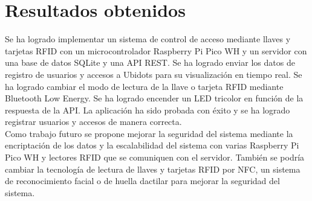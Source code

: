 \documentclass{article}
\begin{document}
\section{Resultados obtenidos}
Se ha logrado implementar un sistema de control de acceso mediante llaves y tarjetas RFID con un microcontrolador Raspberry Pi Pico WH y un servidor con una base de datos SQLite y una API REST.
Se ha logrado enviar los datos de registro de usuarios y accesos a Ubidots para su visualización en tiempo real.
Se ha logrado cambiar el modo de lectura de la llave o tarjeta RFID mediante Bluetooth Low Energy.
Se ha logrado encender un LED tricolor en función de la respuesta de la API.
La aplicación ha sido probada con éxito y se ha logrado registrar usuarios y accesos de manera correcta.\\
Como trabajo futuro se propone mejorar la seguridad del sistema mediante la encriptación de los datos y la escalabilidad del sistema con varias Raspberry Pi Pico WH y lectores RFID que se comuniquen con el servidor.
También se podría cambiar la tecnología de lectura de llaves y tarjetas RFID por NFC, un sistema de reconocimiento facial o de huella dactilar para mejorar la seguridad del sistema.



\end{document}
